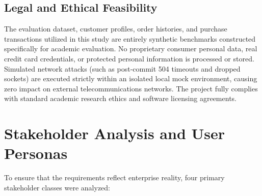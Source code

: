 \subsection{Legal and Ethical Feasibility}
The evaluation dataset, customer profiles, order histories, and purchase transactions utilized in this study are entirely synthetic benchmarks constructed specifically for academic evaluation. No proprietary consumer personal data, real credit card credentials, or protected personal information is processed or stored. Simulated network attacks (such as post-commit 504 timeouts and dropped sockets) are executed strictly within an isolated local mock environment, causing zero impact on external telecommunications networks. The project fully complies with standard academic research ethics and software licensing agreements.

\section{Stakeholder Analysis and User Personas}

To ensure that the requirements reflect enterprise reality, four primary stakeholder classes were analyzed:

